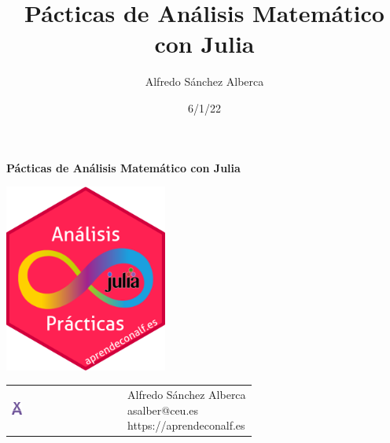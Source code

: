 \documentclass[
  a4paper,
]{scrreport}
\title{Pácticas de Análisis Matemático con Julia}
\author{Alfredo Sánchez Alberca}
\date{6/1/22}
\renewcommand*\contentsname{Tabla de contenidos}
\newcommand\contentsname{Tabla de contenidos}
\theoremstyle{definition}
\theoremstyle{remark}
\begin{document}
\begin{titlepage}

\begin{center}
\vspace*{5cm}

\Huge
{\textbf{\textsf{Pácticas de Análisis Matemático con Julia}}}

\vspace{0.5cm}
\LARGE
{\textbf{\textsf{}}}

\vspace{1.5cm}

\includegraphics[width=0.4\textwidth]{img/logos/sticker.png}
\end{center}

\vfill

\begin{flushleft}
\begin{tabular}{ll}
\includegraphics[width=0.1\textwidth]{img/logos/aprendeconalf.png} & \parbox[b]{5cm}{\Large\textsf{Alfredo
Sánchez
Alberca}\\ \textsf{asalber@ceu.es} \\ \textsf{https://aprendeconalf.es}}
\end{tabular}
\end{flushleft}
\end{titlepage}\ifdefined\Shaded\renewenvironment{Shaded}{\begin{tcolorbox}[enhanced, interior hidden, breakable, boxrule=0pt, borderline west={3pt}{0pt}{shadecolor}, frame hidden, sharp corners]}{\end{tcolorbox}}\fi

\renewcommand*\contentsname{Tabla de contenidos}
{
\hypersetup{linkcolor=}
\setcounter{tocdepth}{2}
\tableofcontents
}
\end{document}
